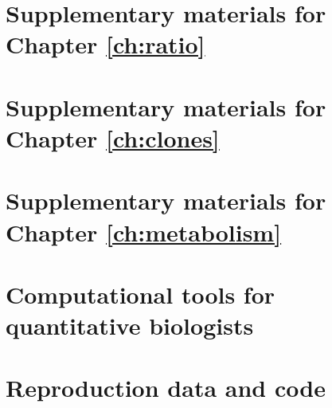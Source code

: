 \chapter{Supplementary materials for Chapter \ref{ch:ratio}}
\label{appendix:supp:ratio}



\newpage

\chapter{Supplementary materials for Chapter \ref{ch:clones}}
\label{appendix:supp:clones}



\newpage

\chapter{Supplementary materials for Chapter \ref{ch:metabolism}}
\label{appendix:supp:metabolism}



\newpage

\chapter{Computational tools for quantitative biologists}
\label{appendix:resources:software}


\chapter{Reproduction data and code}
\label{appendix:resources:reproducibility}

